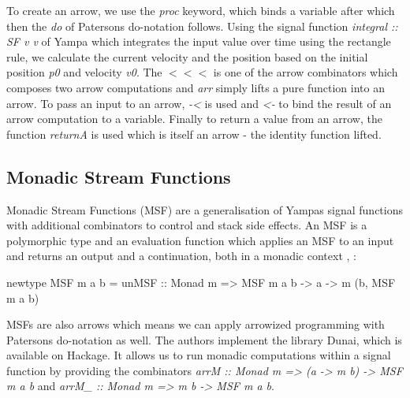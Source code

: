 To create an arrow, we use the \textit{proc} keyword, which binds a variable after which then the \textit{do} of Patersons do-notation \cite{paterson_new_2001} follows. Using the signal function \textit{integral :: SF v v} of Yampa which integrates the input value over time using the rectangle rule, we calculate the current velocity and the position based on the initial position \textit{p0} and velocity \textit{v0}. The $<<<$ is one of the arrow combinators which composes two arrow computations and \textit{arr} simply lifts a pure function into an arrow. To pass an input to an arrow, \textit{-<} is used and \textit{<-} to bind the result of an arrow computation to a variable. Finally to return a value from an arrow, the function \textit{returnA} is used which is itself an arrow - the identity function lifted.

\subsection{Monadic Stream Functions}
Monadic Stream Functions (MSF) are a generalisation of Yampas signal functions with additional combinators to control and stack side effects. An MSF is a polymorphic type and an evaluation function which applies an MSF to an input and returns an output and a continuation, both in a monadic context \cite{perez_functional_2016}, \cite{perez_extensible_2017}:
\begin{HaskellCode}
newtype MSF m a b = 
  unMSF :: Monad m => MSF m a b -> a -> m (b, MSF m a b)
\end{HaskellCode}

MSFs are also arrows which means we can apply arrowized programming with Patersons do-notation as well. The authors \cite{perez_functional_2016} implement the library Dunai, which is available on Hackage. It allows us to run monadic computations within a signal function by providing the combinators \textit{arrM :: Monad m => (a -> m b) -> MSF m a b} and \textit{arrM\_ :: Monad m => m b -> MSF m a b}.